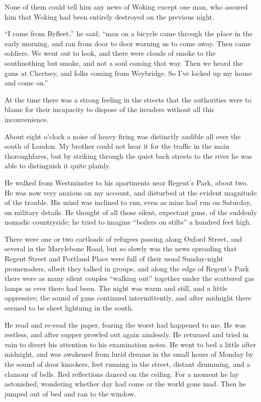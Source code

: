 None of them could tell him any news of Woking except one man, who
assured him that Woking had been entirely destroyed on the previous
night.

``I come from Byfleet,'' he said; ``man on a bicycle came through the
place in the early morning, and ran from door to door warning us to
come away. Then came soldiers. We went out to look, and there were
clouds of smoke to the south\dash{}nothing but smoke, and not a soul
coming that way. Then we heard the guns at Chertsey, and folks
coming from Weybridge. So I've locked up my house and come on.''

At the time there was a strong feeling in the streets that the
authorities were to blame for their incapacity to dispose of the
invaders without all this inconvenience.

About eight o'clock a noise of heavy firing was distinctly audible
all over the south of London. My brother could not hear it for the
traffic in the main thoroughfares, but by striking through the
quiet back streets to the river he was able to distinguish it quite
plainly.

He walked from Westminster to his apartments near Regent's Park,
about two. He was now very anxious on my account, and disturbed at
the evident magnitude of the trouble. His mind was inclined to run,
even as mine had run on Saturday, on military details. He thought
of all those silent, expectant guns, of the suddenly nomadic
countryside; he tried to imagine ``boilers on stilts'' a hundred feet
high.

There were one or two cartloads of refugees passing along Oxford
Street, and several in the Marylebone Road, but so slowly was the
news spreading that Regent Street and Portland Place were full of
their usual Sunday-night promenaders, albeit they talked in groups,
and along the edge of Regent's Park there were as many silent
couples ``walking out'' together under the scattered gas lamps as
ever there had been. The night was warm and still, and a little
oppressive; the sound of guns continued intermittently, and after
midnight there seemed to be sheet lightning in the south.

He read and re-read the paper, fearing the worst had happened to
me. He was restless, and after supper prowled out again aimlessly.
He returned and tried in vain to divert his attention to his
examination notes. He went to bed a little after midnight, and was
awakened from lurid dreams in the small hours of Monday by the
sound of door knockers, feet running in the street, distant
drumming, and a clamour of bells. Red reflections danced on the
ceiling. For a moment he lay astonished, wondering whether day had
come or the world gone mad. Then he jumped out of bed and ran to
the window.

